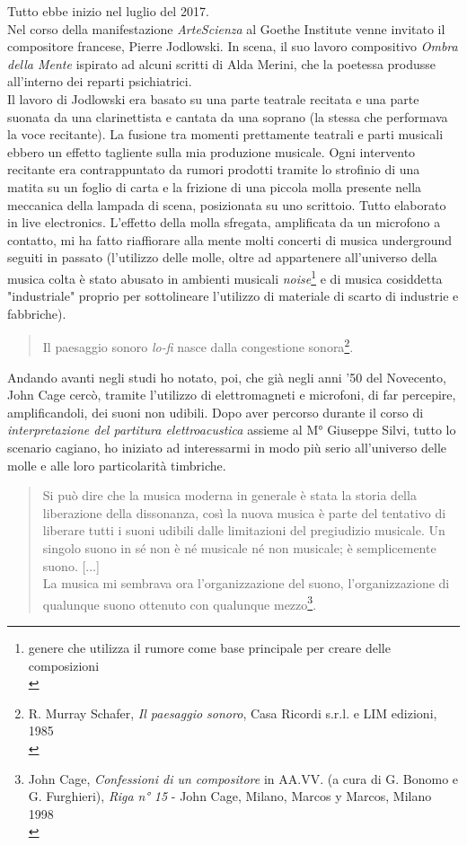 Tutto ebbe inizio nel luglio del 2017. \\
Nel corso della manifestazione \textit{ArteScienza} al Goethe Institute venne invitato il compositore francese, Pierre Jodlowski. In scena, il suo lavoro compositivo \textit{Ombra della Mente} ispirato ad alcuni scritti di Alda Merini, che la poetessa produsse all'interno dei reparti psichiatrici. \\
Il lavoro di Jodlowski era basato su una parte teatrale recitata e una parte suonata da una clarinettista e cantata da una soprano (la stessa che performava la voce recitante). La fusione tra momenti prettamente teatrali e parti musicali ebbero un effetto tagliente sulla mia produzione musicale. Ogni intervento recitante era contrappuntato da rumori prodotti tramite lo strofinio di una matita su un foglio di carta e la frizione di una piccola molla presente nella meccanica della lampada di scena, posizionata su uno scrittoio. Tutto elaborato in live electronics. L'effetto della molla sfregata, amplificata da un microfono a contatto, mi ha fatto riaffiorare alla mente molti concerti di musica underground seguiti in passato (l'utilizzo delle molle, oltre ad appartenere all'universo della musica colta è stato abusato in ambienti musicali \textit{noise}\footnote{genere che utilizza il rumore come base principale per creare delle composizioni \\} e di musica cosiddetta "industriale" proprio per sottolineare l'utilizzo di materiale di scarto di industrie e fabbriche).
\begin{quotation}
Il paesaggio sonoro \textit{lo-fi} nasce dalla congestione sonora\footnote{R. Murray Schafer, \textit{Il paesaggio sonoro}, Casa Ricordi s.r.l. e LIM edizioni, 1985 \\}.
\end{quotation}
Andando avanti negli studi ho notato, poi, che già negli anni '50 del Novecento, John Cage cercò, tramite l'utilizzo di elettromagneti e microfoni, di far percepire, amplificandoli, dei suoni non udibili. Dopo aver percorso durante il corso di \textit{interpretazione del partitura elettroacustica} assieme al M° Giuseppe Silvi, tutto lo scenario cagiano, ho iniziato ad interessarmi in modo più serio all'universo delle molle e alle loro particolarità timbriche. 
\begin{small}
\begin{quotation}
Si può dire che la musica moderna in generale è stata la storia della liberazione della dissonanza, così la nuova musica è parte del tentativo di liberare tutti i suoni udibili dalle limitazioni del pregiudizio musicale.
Un singolo suono in sé non è né musicale né non musicale; è semplicemente suono. [...] \\
La musica mi sembrava ora l'organizzazione del suono, l'organizzazione di qualunque suono ottenuto con qualunque mezzo\footnote{John Cage, \textit{Confessioni di un compositore} in AA.VV. (a cura di G. Bonomo e G. Furghieri), \textit{Riga n° 15} - John Cage, Milano, Marcos y Marcos, Milano 1998 \\}.
\end{quotation}
\end{small}
